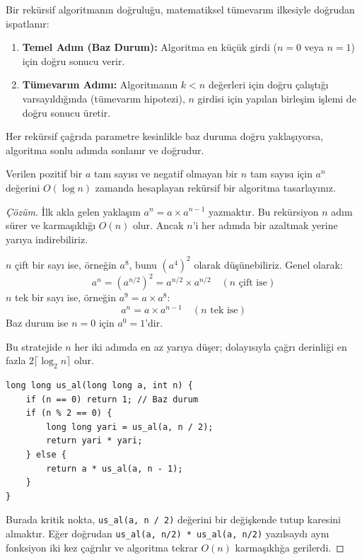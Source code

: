 \begin{theorem}
Bir rekürsif algoritmanın doğruluğu, matematiksel tümevarım ilkesiyle doğrudan ispatlanır:
\begin{enumerate}
    \item \textbf{Temel Adım (Baz Durum):} Algoritma en küçük girdi ($n=0$ veya $n=1$) için doğru sonucu verir.
    \item \textbf{Tümevarım Adımı:} Algoritmanın $k < n$ değerleri için doğru çalıştığı varsayıldığında (tümevarım hipotezi), $n$ girdisi için yapılan birleşim işlemi de doğru sonucu üretir.
\end{enumerate}
Her rekürsif çağrıda parametre kesinlikle baz duruma doğru yaklaşıyorsa, algoritma sonlu adımda sonlanır ve doğrudur.
\end{theorem}

\begin{example}
Verilen pozitif bir $a$ tam sayısı ve negatif olmayan bir $n$ tam sayısı için $a^n$ değerini $O(\log n)$ zamanda hesaplayan rekürsif bir algoritma tasarlayınız.
\end{example}

\begin{proof}[Çözüm]
İlk akla gelen yaklaşım $a^n = a \times a^{n-1}$ yazmaktır. Bu rekürsiyon $n$ adım sürer ve karmaşıklığı $O(n)$ olur. Ancak $n$'i her adımda bir azaltmak yerine yarıya indirebiliriz.

$n$ çift bir sayı ise, örneğin $a^8$, bunu $(a^4)^2$ olarak düşünebiliriz. Genel olarak:
\[
a^n = (a^{n/2})^2 = a^{n/2} \times a^{n/2} \quad (n \text{ çift ise})
\]
$n$ tek bir sayı ise, örneğin $a^9 = a \times a^8$:
\[
a^n = a \times a^{n-1} \quad (n \text{ tek ise})
\]
Baz durum ise $n=0$ için $a^0 = 1$'dir.

Bu stratejide $n$ her iki adımda en az yarıya düşer; dolayısıyla çağrı derinliği en fazla $2 \lceil \log_2 n \rceil$ olur.

\begin{lstlisting}[language=CTemel]
long long us_al(long long a, int n) {
    if (n == 0) return 1; // Baz durum
    if (n % 2 == 0) {
        long long yari = us_al(a, n / 2);
        return yari * yari;
    } else {
        return a * us_al(a, n - 1);
    }
}
\end{lstlisting}

Burada kritik nokta, \texttt{us\_al(a, n / 2)} değerini bir değişkende tutup karesini almaktır. Eğer doğrudan \texttt{us\_al(a, n/2) * us\_al(a, n/2)} yazılsaydı aynı fonksiyon iki kez çağrılır ve algoritma tekrar $O(n)$ karmaşıklığa gerilerdi.
\end{proof}

